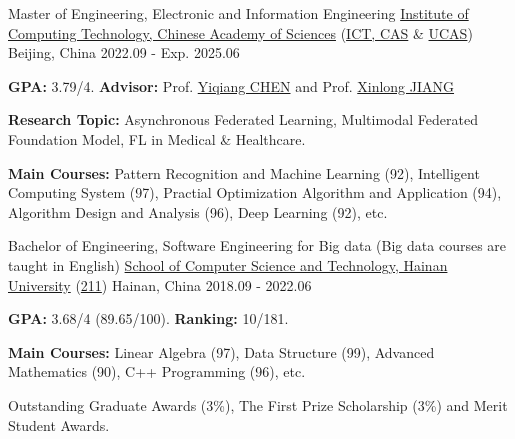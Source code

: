 
\begin{cventries}

\cventry
{Master of Engineering, Electronic and Information Engineering} %
{\href{http://www.ict.cas.cn/}{Institute of Computing Technology, Chinese Academy of Sciences} (\href{http://www.ict.cas.cn/}{ICT, CAS} \& \href{https://www.ucas.ac.cn/}{UCAS})} %
{Beijing, China} %
{2022.09 - Exp. 2025.06} %
{
  \begin{cvitems} %
    \item {\textbf{GPA:} 3.79/4. \textbf{Advisor:} Prof. \href{https://scholar.google.com/citations?user=LC3SwhEAAAAJ&hl=en&oi=ao}{Yiqiang CHEN} and Prof. \href{https://scholar.google.com/citations?user=zMyg3vcAAAAJ&hl=en&oi=ao}{Xinlong JIANG}}
    \item {\textbf{Research Topic:} Asynchronous Federated Learning, Multimodal Federated Foundation Model, FL in Medical \& Healthcare.} %
    \item {\textbf{Main Courses:} Pattern Recognition and Machine Learning (92), Intelligent Computing System (97), Practial Optimization Algorithm and Application (94), Algorithm Design and Analysis (96), Deep Learning (92), etc.}
  \end{cvitems}
}

\cventry
{Bachelor of Engineering, Software Engineering for Big data (Big data courses are taught in English)} %
{\href{https://www.hainanu.edu.cn/}{School of Computer Science and Technology, Hainan University} (\href{https://en.wikipedia.org/wiki/Project_211}{211})} %
{Hainan, China} %
{2018.09 - 2022.06} %
{
  \begin{cvitems} %
    \item {\textbf{GPA:} 3.68/4 (89.65/100). \textbf{Ranking:} 10/181.} %
    \item {\textbf{Main Courses:} Linear Algebra (97), Data Structure (99), Advanced Mathematics (90), C++ Programming (96), etc.}
    \item {Outstanding Graduate Awards (3\%), The First Prize Scholarship (3\%) and Merit Student Awards.}
  \end{cvitems}
}

\end{cventries}
